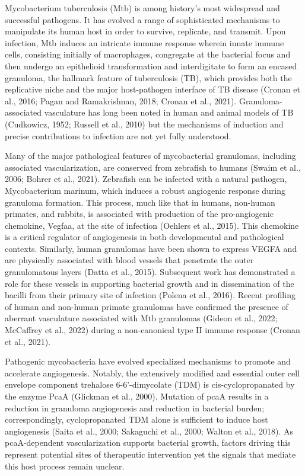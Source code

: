 Mycobacterium tuberculosis (Mtb) is among history’s most widespread and successful pathogens. It has evolved a range of sophisticated mechanisms to manipulate its human host in order to survive, replicate, and transmit. Upon infection, Mtb induces an intricate immune response wherein innate immune cells, consisting initially of macrophages, congregate at the bacterial focus and then undergo an epithelioid transformation and interdigitate to form an encased granuloma, the hallmark feature of tuberculosis (TB), which provides both the replicative niche and the major host-pathogen interface of TB disease (Cronan et al., 2016; Pagan and Ramakrishnan, 2018; Cronan et al., 2021). Granuloma-associated vasculature has long been noted in human and animal models of TB (Cudkowicz, 1952; Russell et al., 2010) but the mechanisms of induction and precise contributions to infection are not yet fully understood.

Many of the major pathological features of mycobacterial granulomas, including associated vascularization, are conserved from zebrafish to humans (Swaim et al., 2006; Bohrer et al., 2021). Zebrafish can be infected with a natural pathogen, Mycobacterium marinum, which induces a robust angiogenic response during granuloma formation. This process, much like that in humans, non-human primates, and rabbits, is associated with production of the pro-angiogenic chemokine, Vegfaa, at the site of infection (Oehlers et al., 2015). This chemokine is a critical regulator of angiogenesis in both developmental and pathological contexts. Similarly, human granulomas have been shown to express VEGFA and are physically associated with blood vessels that penetrate the outer granulomatous layers (Datta et al., 2015). Subsequent work has demonstrated a role for these vessels in supporting bacterial growth and in dissemination of the bacilli from their primary site of infection (Polena et al., 2016). Recent profiling of human and non-human primate granulomas have confirmed the presence of aberrant vasculature associated with Mtb granulomas (Gideon et al., 2022; McCaffrey et al., 2022) during a non-canonical type II immune response (Cronan et al., 2021).

Pathogenic mycobacteria have evolved specialized mechanisms to promote and accelerate angiogenesis. Notably, the extensively modified and essential outer cell envelope component trehalose 6-6’-dimycolate (TDM) is cis-cyclopropanated by the enzyme PcaA (Glickman et al., 2000). Mutation of pcaA results in a reduction in granuloma angiogenesis and reduction in bacterial burden; correspondingly, cyclopropanated TDM alone is sufficient to induce host angiogenesis (Saita et al., 2000; Sakaguchi et al., 2000; Walton et al., 2018). As pcaA-dependent vascularization supports bacterial growth, factors driving this represent potential sites of therapeutic intervention yet the signals that mediate this host process remain unclear.

